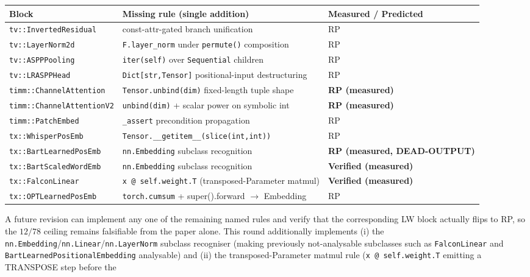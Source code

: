 \begin{table}[h]
\centering\scriptsize\setlength{\tabcolsep}{2.5pt}
\begin{tabular}{lll}
\toprule
Block & Missing rule (single addition) & Measured / Predicted \\
\midrule
\texttt{tv::InvertedResidual} & const-attr-gated branch unification & RP \\
\texttt{tv::LayerNorm2d} & \texttt{F.layer\_norm} under \texttt{permute()} composition & RP \\
\texttt{tv::ASPPPooling} & \texttt{iter(self)} over \texttt{Sequential} children & RP \\
\texttt{tv::LRASPPHead} & \texttt{Dict[str,Tensor]} positional-input destructuring & RP \\
\texttt{timm::ChannelAttention} & \texttt{Tensor.unbind(dim)} fixed-length tuple shape & \textbf{RP (measured)} \\
\texttt{timm::ChannelAttentionV2} & \texttt{unbind(dim)} + scalar power on symbolic int & \textbf{RP (measured)} \\
\texttt{timm::PatchEmbed} & \texttt{\_assert} precondition propagation & RP \\
\texttt{tx::WhisperPosEmb} & \texttt{Tensor.\_\_getitem\_\_(slice(int,int))} & RP \\
\texttt{tx::BartLearnedPosEmb} & \texttt{nn.Embedding} subclass recognition & \textbf{RP (measured, DEAD-OUTPUT)} \\
\texttt{tx::BartScaledWordEmb} & \texttt{nn.Embedding} subclass recognition & \textbf{Verified (measured)} \\
\texttt{tx::FalconLinear} & \texttt{x @ self.weight.T} (transposed-Parameter matmul) & \textbf{Verified (measured)} \\
\texttt{tx::OPTLearnedPosEmb} & \texttt{torch.cumsum} + super().forward $\to$ Embedding & RP \\
\bottomrule
\end{tabular}
\end{table}
A future revision can implement any one of the remaining named rules and
verify that the corresponding LW block actually flips to RP, so
the $12/78$ ceiling remains falsifiable from the paper alone.
This round additionally implements (i) the \texttt{nn.Embedding}/\texttt{nn.Linear}/\texttt{nn.LayerNorm}
subclass recogniser (making previously not-analysable subclasses such as
\texttt{FalconLinear} and \texttt{BartLearnedPositionalEmbedding} analysable)
and (ii) the transposed-Parameter matmul rule
(\texttt{x @ self.weight.T} emitting a \textsc{TRANSPOSE} step before the
